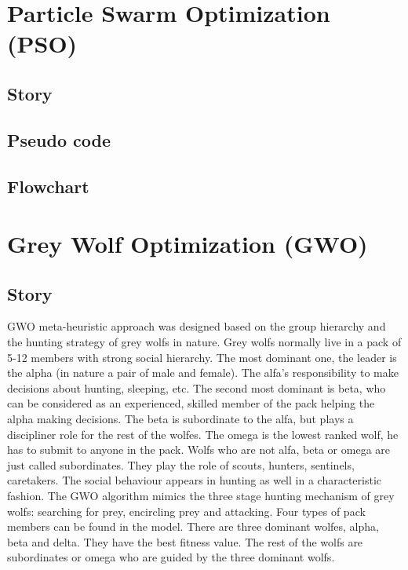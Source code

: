 \documentclass[border=0.2cm]{report}
\begin{document}
\chapter{Particle Swarm Optimization (PSO)}
\section{Story}
\section{Pseudo code}
\section{Flowchart}

\chapter{Grey Wolf Optimization (GWO)}
\section{Story}

GWO \cite{gwo1} meta-heuristic approach was designed based on the group hierarchy and the hunting strategy of grey wolfs in nature. Grey wolfs normally live in a pack of 5-12 members with strong social hierarchy. The most dominant one, the leader is the alpha (in nature a pair of male and female). The alfa's responsibility to make decisions about hunting, sleeping, etc. The second most dominant is beta, who can be considered as an experienced, skilled member of the pack helping the alpha making decisions. The beta is subordinate to the alfa, but plays a discipliner role for the rest of the wolfes. The omega is the lowest ranked wolf, he has to submit to anyone in the pack. Wolfs who are not alfa, beta or omega are just called subordinates. They play the role of scouts, hunters, sentinels, caretakers. The social behaviour appears in hunting as well in a characteristic fashion. The GWO algorithm mimics the three stage hunting mechanism of grey wolfs: searching for prey, encircling prey and attacking. Four types of pack members can be found in the model. There are three dominant wolfes, alpha, beta and delta. They have the best fitness value. The rest of the wolfs are subordinates or omega who are guided by the three dominant wolfs. \\
\end{document}
